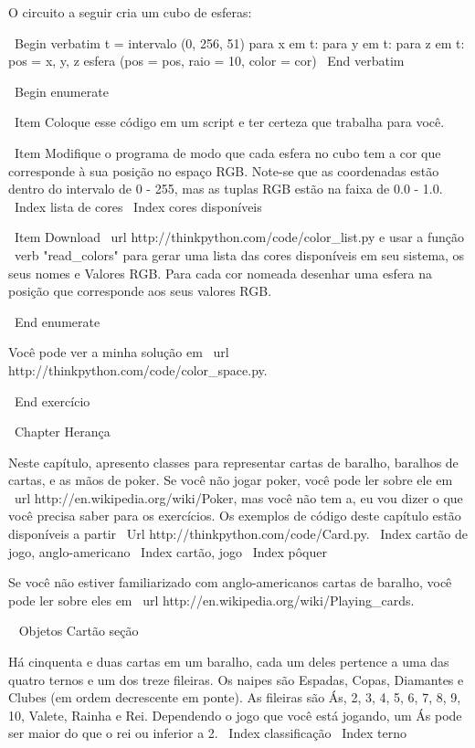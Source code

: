 \documentclass[10pt]{book}
\begin{document}
\begin {itemize}
{{{{{{{{{{{{{{O circuito a seguir cria um cubo de esferas:

\ Begin {verbatim}
t = intervalo (0, 256, 51)
para x em t:
    para y em t:
        para z em t:
            pos = x, y, z
            esfera (pos = pos, raio = 10, color = cor)
\ End {verbatim}

\ Begin {enumerate}

\ Item Coloque esse código em um script e ter certeza que trabalha para
você.

\ Item Modifique o programa de modo que cada esfera no cubo
tem a cor que corresponde à sua posição no espaço RGB.
Note-se que as coordenadas estão dentro do intervalo de 0 - 255, mas
as tuplas RGB estão na faixa de 0.0 - 1.0.
\ Index {lista de cores}
\ Index {cores disponíveis}

\ Item Download \ url {http://thinkpython.com/code/color_list.py}
e usar a função \ verb "read_colors" para gerar uma lista
das cores disponíveis em seu sistema, os seus nomes e
Valores RGB. Para cada cor nomeada desenhar uma esfera na
posição que corresponde aos seus valores RGB.



\ End {enumerate}

Você pode ver a minha solução em \ url {http://thinkpython.com/code/color_space.py}.

\ End {} exercício


\ Chapter {} Herança

Neste capítulo, apresento classes para representar cartas de baralho,
baralhos de cartas, e as mãos de poker. Se você não jogar poker, você pode
ler sobre ele em \ url {http://en.wikipedia.org/wiki/Poker}, mas você não tem
a, eu vou dizer o que você precisa saber para os exercícios.
Os exemplos de código deste capítulo estão disponíveis a partir
\ Url {http://thinkpython.com/code/Card.py}.
\ Index {cartão de jogo, anglo-americano}
\ Index {cartão, jogo}
\ Index {} pôquer

Se você não estiver familiarizado com anglo-americanos cartas de baralho,
você pode ler sobre eles em \ url {http://en.wikipedia.org/wiki/Playing_cards}.


\ {} Objetos Cartão seção

Há cinquenta e duas cartas em um baralho, cada um deles pertence a uma das
quatro ternos e um dos treze fileiras. Os naipes são Espadas, Copas,
Diamantes e Clubes (em ordem decrescente em ponte). As fileiras são
Ás, 2, 3, 4, 5, 6, 7, 8, 9, 10, Valete, Rainha e Rei. Dependendo
o jogo que você está jogando, um Ás pode ser maior do que o rei
ou inferior a 2.
\ Index {} classificação
\ Index {terno}

}}}}}}}}}}}}}}
\end{itemize}
\end{document}
